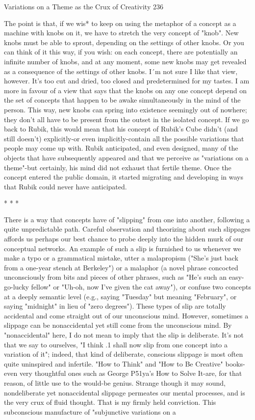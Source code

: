 Variations on a Theme as the Crux of Creativity                                     236

The point is that, if we wis* to keep on using the metaphor of a concept as a machine
with knobs on it, we have to stretch the very concept of "knob". New knobs must be
able to sprout, depending on the settings of other knobs. Or you can think of it this
way, if you wish: on each concept, there are potentially an infinite number of knobs,
and at any moment, some new knobs may get revealed as a consequence of the
settings of other knobs.
        I´m not sure I like that view, however. It's too cut and dried, too closed and
predetermined for my tastes. I am more in favour of a view that says that the knobs on
any one concept depend on the set of concepts that happen to be awake
simultaneously in the mind of the person. This way, new knobs can spring into
existence seemingly out of nowhere; they don't all have to be present from the outset
in the isolated concept. If we go back to Rubik, this would mean that his concept of
Rubik's Cube didn't (and still doesn't) explicitly-or even implicitly-contain all the
possible variations that people may come up with. Rubik anticipated, and even
designed, many of the objects that have subsequently appeared and that we perceive
as "variations on a theme"-but certainly, his mind did not exhaust that fertile theme.
Once the concept entered the public domain, it started migrating and developing in
ways that Rubik could never have anticipated.

                                       *   *   *

        There is a way that concepts have of "slipping" from one into another,
following a quite unpredictable path. Careful observation and theorizing about such
slippages affords us perhaps our best chance to probe deeply into the hidden murk of
our conceptual networks. An example of such a slip is furnished to us whenever we
make a typo or a grammatical mistake, utter a malapropism ("She's just back from a
one-year stench at Berkeley") or a malaphor (a novel phrase concocted unconsciously
from bits and pieces of other phrases, such as "He's such an easy-go-lucky fellow" or
"Uh-oh, now I've given the cat away"), or confuse two concepts at a deeply semantic
level (e.g., saying "Tuesday" but meaning "February", or saying "midnight" in lieu of
"zero degrees"). These types of slip are totally accidental and come straight out of our
unconscious mind.
        However, sometimes a slippage can be nonaccidental yet still come from the
unconscious mind. By "nonaccidental" here, I do not mean to imply that the slip is
deliberate. It's not that we say to ourselves, "I think .1 shall now slip from one
concept into a variation of it"; indeed, that kind of deliberate, conscious slippage is
most often quite uninspired and infertile. "How to Think" and "How to Be Creative"
books-even very thoughtful ones such as George P51ya's How to Solve It-are, for that
reason, of little use to the would-be genius.
        Strange though it may sound, nondeliberate yet nonaccidental slippage
permeates our mental processes, and is the very crux of fluid thought. That is my
firmly held conviction. This subconscious manufacture of "subjunctive variations on a





